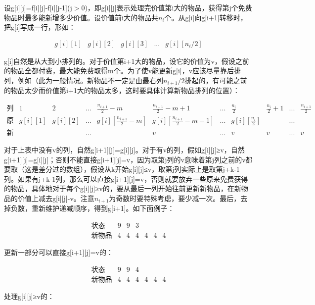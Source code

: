 \documentclass[UTF8]{ctexart}
\theoremstyle{nonumberplain}
\begin{document}
			设g[i][j]=f[i][j]-f[i][j-1](j$>$0)，即g[i][j]表示处理完价值第i大的物品，获得第j个免费物品时最多能新增多少价值。设价值前i大的物品共$n_i$个。从g[i]向g[i+1]转移时，把g[i]写成一行，形如：
			
			$$ \begin{array}{ccccc} g[i][1] & g[i][2] & g[i][3] & ... & g[i][n_i/2] \end{array} $$
			
			g[i]自然是从大到小排列的。对于价值第i+1大的物品，设它的价值为v，假设之前的物品全都付费，最大能免费取得m个。为了使v能更新g[i]，v应该尽量靠后排列，例如（此为一般情况。新物品不一定是由最右列$n_{i+1}/2$排起的，有可能之前的物品太少而价值第i+1大的物品太多，这时要具体计算新物品排列的位置）：
			
			$$ \begin{array}{lcccccccccc}
				\mbox{列编号} & 1 & 2 & ... & \frac{n_{i+1}}{2}-m & \frac{n_{i+1}}{2}-m+1 & ... & \frac{n_i}{2} & \frac{n_i}{2}+1 & ... & \frac{n_{i+1}}{2} \\
				\mbox{原状态} & g[i][1] & g[i][2] & ... & g[i][\frac{n_{i+1}}{2}-m] & g[i][\frac{n_{i+1}}{2}-m+1] & ... & g[i][\frac{n_i}{2}] & & ... & \\
				\mbox{新物品} & & & ... & & v & ... & v & v & ... & v
			\end{array} $$
			
			对于上表中没有v的列，自然g[i+1][j]=g[i][j]。对于有v的列，假如g[i][j]≥v，自然g[i+1][j]=g[i][j]；否则不能直接g[i+1][j]=v，因为取第j列的v意味着第j列之前的v都要取（这是差分过的数组），假设从k开始g[i][j]≤v，取第j列实际上是取第j+k-1列。如果有j+k-1列，那么可以直接g[i+1][j]=v，否则就要放弃一些原来免费获得的物品，具体地对于每个g[i][j]≥v的，要从最后一列开始往前更新新物品，在新物品的价值上减去g[i][j]-v。注意$n_{i+1}$为奇数时要特殊考虑，要少减一次。最后，去掉负数，重新维护递减顺序，得到g[i+1]。如下面例子：
			
			$$\begin{array}{lcccccc}
				\mbox{状态} & 9 & 9 & 3 &  &  &  \\
				\mbox{新物品} & 4 & 4 & 4 & 4 & 4 & 4
			\end{array}$$
			
			更新一部分可以直接g[i+1][j]=v的：
			
			$$\begin{array}{lcccccc}
				\mbox{状态} & 9 & 9 & 4 &  &  &  \\
				\mbox{新物品} & 4 & 4 & 4 & 4 & 4 & 4
			\end{array}$$
			
			处理g[i][j]≥v的：
			
\end{document}
